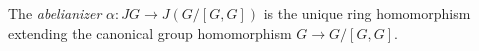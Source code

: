The \textit{abelianizer} $\alpha: JG \to J(G/[G,G])$ is the unique ring homomorphism extending the canonical group homomorphism $G \to G/[G,G]$.
